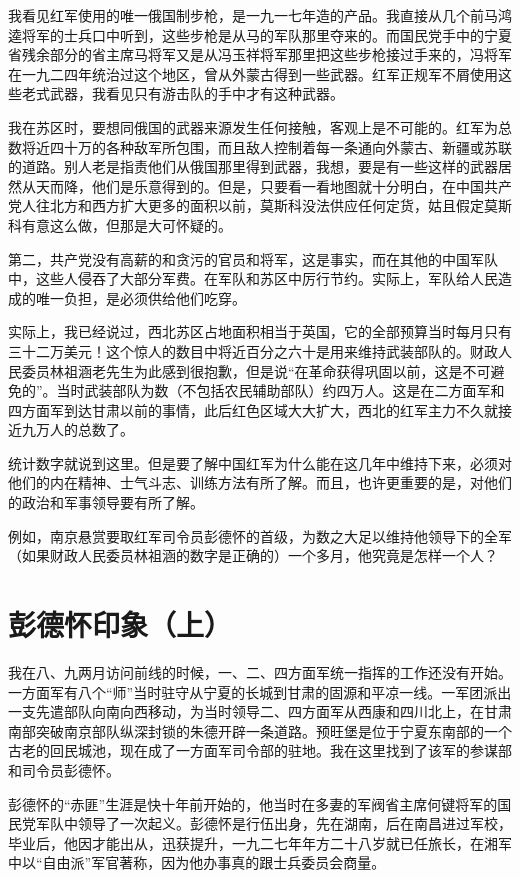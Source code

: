 \documentclass[10pt]{book}
\begin{document}
我看见红军使用的唯一俄国制步枪，是一九一七年造的产品。我直接从几个前马鸿逵将军的士兵口中听到，这些步枪是从马的军队那里夺来的。而国民党手中的宁夏省残余部分的省主席马将军又是从冯玉祥将军那里把这些步枪接过手来的，冯将军在一九二四年统治过这个地区，曾从外蒙古得到一些武器。红军正规军不屑使用这些老式武器，我看见只有游击队的手中才有这种武器。

我在苏区时，要想同俄国的武器来源发生任何接触，客观上是不可能的。红军为总数将近四十万的各种敌军所包围，而且敌人控制着每一条通向外蒙古、新疆或苏联的道路。别人老是指责他们从俄国那里得到武器，我想，要是有一些这样的武器居然从天而降，他们是乐意得到的。但是，只要看一看地图就十分明白，在中国共产党人往北方和西方扩大更多的面积以前，莫斯科没法供应任何定货，姑且假定莫斯科有意这么做，但那是大可怀疑的。

第二，共产党没有高薪的和贪污的官员和将军，这是事实，而在其他的中国军队中，这些人侵吞了大部分军费。在军队和苏区中厉行节约。实际上，军队给人民造成的唯一负担，是必须供给他们吃穿。

实际上，我已经说过，西北苏区占地面积相当于英国，它的全部预算当时每月只有三十二万美元！这个惊人的数目中将近百分之六十是用来维持武装部队的。财政人民委员林祖涵老先生为此感到很抱歉，但是说“在革命获得巩固以前，这是不可避免的”。当时武装部队为数（不包括农民辅助部队）约四万人。这是在二方面军和四方面军到达甘肃以前的事情，此后红色区域大大扩大，西北的红军主力不久就接近九万人的总数了。

统计数字就说到这里。但是要了解中国红军为什么能在这几年中维持下来，必须对他们的内在精神、士气斗志、训练方法有所了解。而且，也许更重要的是，对他们的政治和军事领导要有所了解。

例如，南京悬赏要取红军司令员彭德怀的首级，为数之大足以维持他领导下的全军（如果财政人民委员林祖涵的数字是正确的）一个多月，他究竟是怎样一个人？

\section{彭德怀印象（上）}

我在八、九两月访问前线的时候，一、二、四方面军统一指挥的工作还没有开始。一方面军有八个“师”当时驻守从宁夏的长城到甘肃的固源和平凉一线。一军团派出一支先遣部队向南向西移动，为当时领导二、四方面军从西康和四川北上，在甘肃南部突破南京部队纵深封锁的朱德开辟一条道路。预旺堡是位于宁夏东南部的一个古老的回民城池，现在成了一方面军司令部的驻地。我在这里找到了该军的参谋部和司令员彭德怀。

彭德怀的“赤匪”生涯是快十年前开始的，他当时在多妻的军阀省主席何键将军的国民党军队中领导了一次起义。彭德怀是行伍出身，先在湖南，后在南昌进过军校，毕业后，他因才能出从，迅获提升，一九二七年年方二十八岁就已任旅长，在湘军中以“自由派”军官著称，因为他办事真的跟士兵委员会商量。
\end{document}

